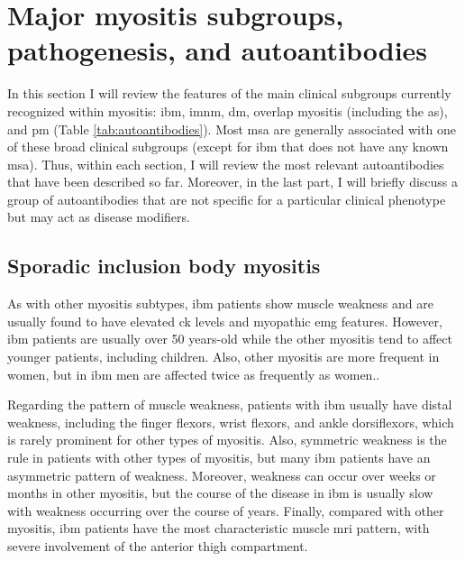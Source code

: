 \section{Major myositis subgroups, pathogenesis, and autoantibodies}

In this section I will review the features of the main clinical subgroups currently recognized within myositis: \gls{ibm}, \gls{imnm}, \gls{dm}, overlap myositis (including the \gls{as}), and \gls{pm} (Table \ref{tab:autoantibodies}). Most \gls{msa} are generally associated with one of these broad clinical subgroups (except for \gls{ibm} that does not have any known \gls{msa}). Thus, within each section, I will review the most relevant autoantibodies that have been described so far. Moreover, in the last part, I will briefly discuss a group of autoantibodies that are not specific for a particular clinical phenotype but may act as disease modifiers.

\subsection{Sporadic inclusion body myositis}

As with other myositis subtypes, \gls{ibm} patients show muscle weakness and are usually found to have elevated \gls{ck} levels and myopathic \gls{emg} features. However, \gls{ibm} patients are usually over 50 years-old while the other myositis tend to affect younger patients, including children.\cite{SelvaOCallaghan2018} Also, other myositis are more frequent in women, but in \gls{ibm} men are affected twice as frequently as women.\cite{SelvaOCallaghan2018}.

Regarding the pattern of muscle weakness, patients with \gls{ibm} usually have distal weakness, including the finger flexors, wrist flexors, and ankle dorsiflexors, which is rarely prominent for other types of myositis.\cite{Lloyd2014,SelvaOCallaghan2018} Also, symmetric weakness is the rule in patients with other types of myositis, but many \gls{ibm} patients have an asymmetric pattern of weakness.\cite{SelvaOCallaghan2018} Moreover, weakness can occur over weeks or months in other myositis, but the course of the disease in \gls{ibm} is usually slow with weakness occurring over the course of years.\cite{SelvaOCallaghan2018} Finally, compared with other myositis, \gls{ibm} patients have the most characteristic muscle \gls{mri} pattern, with severe involvement of the anterior thigh compartment.\cite{Tasca2015,PinalFernandez2017}

